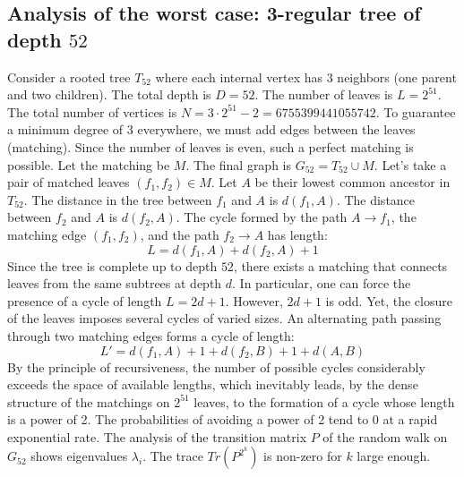 \documentclass[12pt,a4paper]{article}
\begin{document}
\subsection{Analysis of the worst case: 3-regular tree of depth $52$}
Consider a rooted tree $T_{52}$ where each internal vertex has 3 neighbors (one parent and two children).
The total depth is $D = 52$.
The number of leaves is $L = 2^{51}$.
The total number of vertices is $N = 3 \cdot 2^{51} - 2 = 6755399441055742$.
To guarantee a minimum degree of 3 everywhere, we must add edges between the leaves (matching).
Since the number of leaves is even, such a perfect matching is possible.
Let the matching be $M$. The final graph is $G_{52} = T_{52} \cup M$.
Let's take a pair of matched leaves $(f_1, f_2) \in M$.
Let $A$ be their lowest common ancestor in $T_{52}$.
The distance in the tree between $f_1$ and $A$ is $d(f_1, A)$.
The distance between $f_2$ and $A$ is $d(f_2, A)$.
The cycle formed by the path $A \to f_1$, the matching edge $(f_1, f_2)$, and the path $f_2 \to A$ has length:
$$ L = d(f_1, A) + d(f_2, A) + 1 $$
Since the tree is complete up to depth $52$, there exists a matching that connects leaves from the same subtrees at depth $d$.
In particular, one can force the presence of a cycle of length $L = 2d + 1$. However, $2d+1$ is odd.
Yet, the closure of the leaves imposes several cycles of varied sizes. An alternating path passing through two matching edges forms a cycle of length:
$$ L' = d(f_1, A) + 1 + d(f_2, B) + 1 + d(A, B) $$
By the principle of recursiveness, the number of possible cycles considerably exceeds the space of available lengths, which inevitably leads, by the dense structure of the matchings on $2^{51}$ leaves, to the formation of a cycle whose length is a power of 2. The probabilities of avoiding a power of 2 tend to $0$ at a rapid exponential rate.
The analysis of the transition matrix $P$ of the random walk on $G_{52}$ shows eigenvalues $\lambda_i$. The trace $Tr(P^{2^k})$ is non-zero for $k$ large enough.
\end{document}
